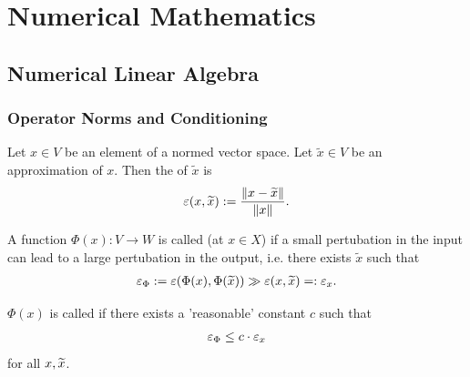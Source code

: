 \part{Numerical Mathematics}
\chapter{Numerical Linear Algebra}
\section{Operator Norms and Conditioning}
\begin{definition}
	Let $x \in V$ be an element of a normed vector space. Let $\tilde x \in V$ be an approximation of $x$. Then the  of $\tilde x$ is
	\begin{align*}
		\varepsilon(x, \widetilde x) 
		:= \frac{\norm{x - \widetilde x}}{\norm{x}}.
	\end{align*}
\end{definition}
\begin{definition}
	A function $\Phi(x) : V \to W$ is called  (at $x \in X$) if a small pertubation in the input can lead to a large pertubation in the output, i.e. there exists $\tilde x$ such that 
	\begin{align*}
		\varepsilon_\Phi := \varepsilon(\Phi(x), \Phi(\widetilde x)) \gg \varepsilon(x, \widetilde x) =: \varepsilon_x.
	\end{align*}
	
	$\Phi(x)$ is called  if there exists a 'reasonable' constant $c$ such that 
	\begin{align*}
		\varepsilon_\Phi \leq c \cdot \varepsilon_x
	\end{align*} for all $x, \widetilde x$.
\end{definition}

